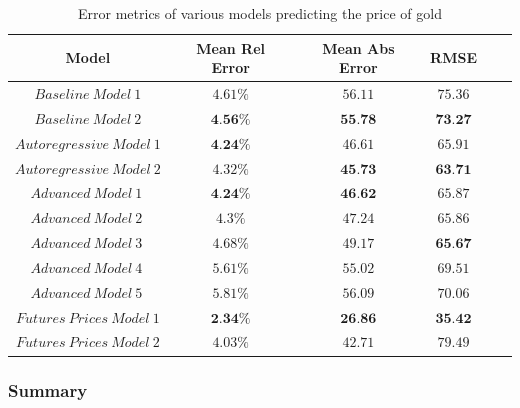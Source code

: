 \documentclass[runningheads]{llncs}
\begin{document}
\begin{table}
\begin{center}
\begin{tabular}{|c|c|c|c|c|c}
\hline
\textbf{Model} & \textbf{Mean Rel Error} & \textbf{Mean Abs Error} & \textbf{RMSE} \\ \hline \hline
$ Baseline\ Model\ 1 $ & $4.61\%$ & $56.11$ & $75.36$  \\ \hline
$ Baseline\ Model\ 2 $ & $\textbf{4.56\%}$ & $\textbf{55.78}$ & $\textbf{73.27}$ \\ \hline \hline

$ Autoregressive\ Model\ 1 $  & $\textbf{4.24\%}$ & $46.61$ & $65.91$ \\ \hline
$ Autoregressive\ Model\ 2 $ & $4.32\%$ & $\textbf{45.73}$ & $\textbf{63.71}$ \\ \hline \hline

$ Advanced\ Model\ 1\ $ & $\textbf{4.24}\%$ & $\textbf{46.62}$ & $65.87$ \\ \hline
$ Advanced\ Model\ 2\ $ & $4.3\%$ & $47.24$ & $65.86$ \\ \hline
$ Advanced\ Model\ 3\ $ & $4.68\%$ & $49.17$ & $\textbf{65.67}$ \\ \hline
$ Advanced\ Model\ 4\ $ & $5.61\%$ & $55.02$ & $69.51$ \\ \hline
$ Advanced\ Model\ 5\ $ & $5.81\%$ & $56.09$ & $70.06$ \\ \hline \hline

$ Futures\ Prices\ Model\ 1 $ & $\textbf{2.34}\%$ & $\textbf{26.86}$ & $\textbf{35.42}$ \\ \hline
$ Futures\ Prices\ Model\ 2 $ & $4.03\%$ & $42.71$ & $79.49$ \\ \hline
\end{tabular}
\end{center} 

\caption{Error metrics of various models predicting the price of gold}
\end{table} 


\subsubsection{Summary}
\end{document}
